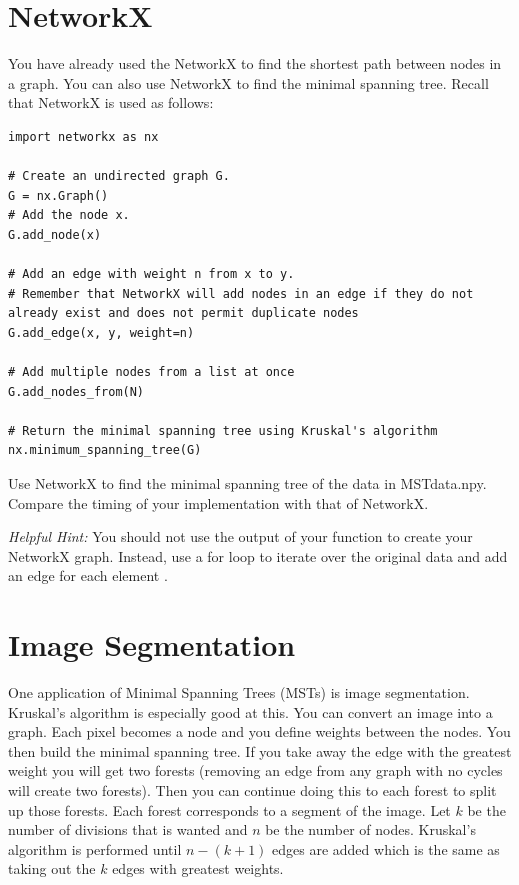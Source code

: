 \section*{NetworkX}

You have already used the NetworkX to find the shortest path between nodes in a graph. You can also use NetworkX to find the minimal spanning tree. Recall that NetworkX is used as follows:
\begin{lstlisting}
import networkx as nx

# Create an undirected graph G.
G = nx.Graph()
# Add the node x.
G.add_node(x)

# Add an edge with weight n from x to y.
# Remember that NetworkX will add nodes in an edge if they do not already exist and does not permit duplicate nodes
G.add_edge(x, y, weight=n)

# Add multiple nodes from a list at once
G.add_nodes_from(N)

# Return the minimal spanning tree using Kruskal's algorithm
nx.minimum_spanning_tree(G)
\end{lstlisting}

\begin{problem}
Use NetworkX to find the minimal spanning tree of the data in MSTdata.npy.
Compare the timing of your implementation with that of NetworkX.

\emph{Helpful Hint:} You should not use the output of your  function to create your NetworkX graph. Instead, use a for loop to iterate over the original data and add an edge  for each element  .
\end{problem}


\section*{Image Segmentation}


One application of Minimal Spanning Trees (MSTs) is image segmentation.
Kruskal's algorithm is especially good at this.
You can convert an image into a graph. Each pixel becomes a node and you define weights between the nodes. You then build the minimal spanning tree. If you take away the edge with the greatest weight you will get two forests (removing an edge from any graph with no cycles will create two forests). Then you can continue doing this to each forest to split up those forests. Each forest corresponds to a segment of the image.
Let $k$ be the number of divisions that is wanted and $n$ be the number of nodes.
Kruskal's algorithm is performed until $n-(k+1)$ edges are added which is the same as taking out the $k$ edges with greatest weights.

